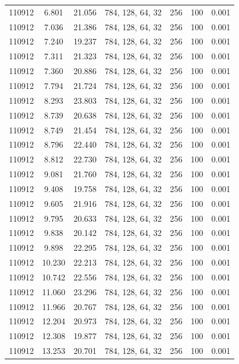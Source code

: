 \documentclass{article} %
\theoremstyle{definition}
\begin{document}
\begin{table}[H]
\begin{tabular}{r c c l r r c}
    110912 & 6.801 & 21.056 & 784, 128, 64, 32 & 256 & 100 & 0.001 \\
    110912 & 7.036 & 21.386 & 784, 128, 64, 32 & 256 & 100 & 0.001 \\
    110912 & 7.240 & 19.237 & 784, 128, 64, 32 & 256 & 100 & 0.001 \\
    110912 & 7.311 & 21.323 & 784, 128, 64, 32 & 256 & 100 & 0.001 \\
    110912 & 7.360 & 20.886 & 784, 128, 64, 32 & 256 & 100 & 0.001 \\
    110912 & 7.794 & 21.724 & 784, 128, 64, 32 & 256 & 100 & 0.001 \\
    110912 & 8.293 & 23.803 & 784, 128, 64, 32 & 256 & 100 & 0.001 \\
    110912 & 8.739 & 20.638 & 784, 128, 64, 32 & 256 & 100 & 0.001 \\
    110912 & 8.749 & 21.454 & 784, 128, 64, 32 & 256 & 100 & 0.001 \\
    110912 & 8.796 & 22.440 & 784, 128, 64, 32 & 256 & 100 & 0.001 \\
    110912 & 8.812 & 22.730 & 784, 128, 64, 32 & 256 & 100 & 0.001 \\
    110912 & 9.081 & 21.760 & 784, 128, 64, 32 & 256 & 100 & 0.001 \\
    110912 & 9.408 & 19.758 & 784, 128, 64, 32 & 256 & 100 & 0.001 \\
    110912 & 9.605 & 21.916 & 784, 128, 64, 32 & 256 & 100 & 0.001 \\
    110912 & 9.795 & 20.633 & 784, 128, 64, 32 & 256 & 100 & 0.001 \\
    110912 & 9.838 & 20.142 & 784, 128, 64, 32 & 256 & 100 & 0.001 \\
    110912 & 9.898 & 22.295 & 784, 128, 64, 32 & 256 & 100 & 0.001 \\
    110912 & 10.230 & 22.213 & 784, 128, 64, 32 & 256 & 100 & 0.001 \\
    110912 & 10.742 & 22.556 & 784, 128, 64, 32 & 256 & 100 & 0.001 \\
    110912 & 11.060 & 23.296 & 784, 128, 64, 32 & 256 & 100 & 0.001 \\
    110912 & 11.966 & 20.767 & 784, 128, 64, 32 & 256 & 100 & 0.001 \\
    110912 & 12.204 & 20.973 & 784, 128, 64, 32 & 256 & 100 & 0.001 \\
    110912 & 12.308 & 19.877 & 784, 128, 64, 32 & 256 & 100 & 0.001 \\
    110912 & 13.253 & 20.701 & 784, 128, 64, 32 & 256 & 100 & 0.001 \\

\end{tabular}
\end{table}
\end{document}
